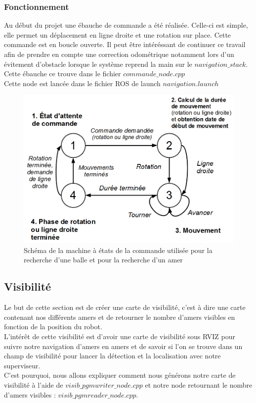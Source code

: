 \documentclass[10pt,a4paper]{article}
\begin{document}
\subsubsection*{Fonctionnement}

Au début du projet une ébauche de commande a été réalisée. Celle-ci est simple, elle permet un déplacement en ligne droite et une rotation sur place. Cette commande est en boucle ouverte. Il peut \^etre intéréssant de continuer ce travail afin de prendre en compte une correction odométrique notamment lors d'un évitement d'obstacle lorsque le système reprend la main sur le $navigation\_stack$.\\
Cette ébauche ce trouve dans le fichier $commande\_node.cpp$ \\
Cette node est lancée dans le fichier ROS de launch $navigation.launch$


\begin{figure}[!h]
\centering\includegraphics[scale=0.4]{figures/commande_MEF.png}
\caption{Schéma de la machine à états de la commande utilisée pour la recherche d'une balle et pour la recherche d'un amer}
\label{commande_MEF}
\end{figure}

\subsection{Visibilité}
Le but de cette section est de créer une carte de visibilité, c'est à dire une carte contenant nos différents amers et de retourner le nombre d'amers visibles en fonction de la position du robot.\\
L’intérêt de cette visibilité est d'avoir une carte de visibilité sous RVIZ pour suivre notre navigation d'amers en amers et de savoir si l'on se trouve dans un champ de visibilité pour lancer la détection et la localisation avec notre superviseur.\\
C'est pourquoi, nous allons expliquer comment nous générons notre carte de visibilité à l'aide de $visib\_pgmwriter\_node.cpp$ et notre node retournant le nombre d'amers visibles : $visib\_pgmreader\_node.cpp$.
\end{document}
